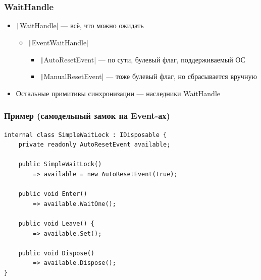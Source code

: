 \documentclass{../../slides-style}
\begin{document}
    \begin{frame}
        \frametitle{WaitHandle}
        \begin{itemize}
            \item \texttt|WaitHandle| --- всё, что можно ожидать
            \begin{itemize}
                \item \texttt|EventWaitHandle|
                \begin{itemize}
                    \item \texttt|AutoResetEvent| --- по сути, булевый флаг, поддерживаемый ОС
                    \item \texttt|ManualResetEvent| --- тоже булевый флаг, но сбрасывается вручную
                \end{itemize}
            \end{itemize}
            \item Остальные примитивы синхронизации --- наследники WaitHandle
        \end{itemize}
    \end{frame}

    \begin{frame}[fragile]
        \frametitle{Пример (самодельный замок на Event-ах)}
        \begin{small}
            \begin{verbatim}
internal class SimpleWaitLock : IDisposable {
    private readonly AutoResetEvent available;

    public SimpleWaitLock() 
        => available = new AutoResetEvent(true); 

    public void Enter() 
        => available.WaitOne();

    public void Leave() {
        => available.Set();

    public void Dispose() 
        => available.Dispose();
}
            \end{verbatim}
        \end{small}
    \end{frame}
\end{document}
